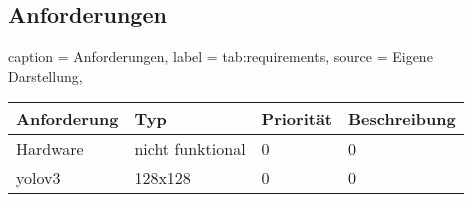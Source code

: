 \subsection{Anforderungen}

\begin{dhbwtable}{%
    caption	= Anforderungen,
    label	= tab:requirements,
    source	= Eigene Darstellung,
}

\begin{tabular}{llll}
    \toprule
    \textbf{Anforderung}     & \textbf{Typ}    & \textbf{Priorität}   & \textbf{Beschreibung}\\\midrule
    Hardware              & nicht funktional               & 0                             & 0\\
    yolov3              & 128x128               & 0                             & 0\\\bottomrule
\end{tabular}   
    
\end{dhbwtable}
